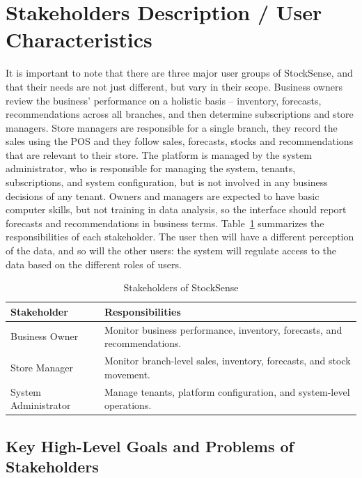 \documentclass{StockSense}
\begin{document}
\section{Stakeholders Description / User Characteristics}

It is important to note that there are three major user groups of StockSense, and that their needs are not just different, but vary in their scope. Business owners review the business' performance on a holistic basis – inventory, forecasts, recommendations across all branches, and then determine subscriptions and store managers. Store managers are responsible for a single branch, they record the sales using the POS and they follow sales, forecasts, stocks and recommendations that are relevant to their store. The platform is managed by the system administrator, who is responsible for managing the system, tenants, subscriptions, and system configuration, but is not involved in any business decisions of any tenant. Owners and managers are expected to have basic computer skills, but not training in data analysis, so the interface should report forecasts and recommendations in business terms. Table~\ref{tab:stakeholders} summarizes the responsibilities of each stakeholder. The user then will have a different perception of the data, and so will the other users: the system will regulate access to the data based on the different roles of users.

\begin{table}[!htbp]
\centering
\caption{Stakeholders of StockSense}
\label{tab:stakeholders}
\begin{tabular}{|l|p{9cm}|}
\hline
\textbf{Stakeholder} & \textbf{Responsibilities} \\ \hline
Business Owner & Monitor business performance, inventory, forecasts, and recommendations. \\ \hline
Store Manager & Monitor branch-level sales, inventory, forecasts, and stock movement. \\ \hline
System Administrator & Manage tenants, platform configuration, and system-level operations. \\ \hline
\end{tabular}
\end{table}

\subsection{Key High-Level Goals and Problems of Stakeholders}
\end{document}
